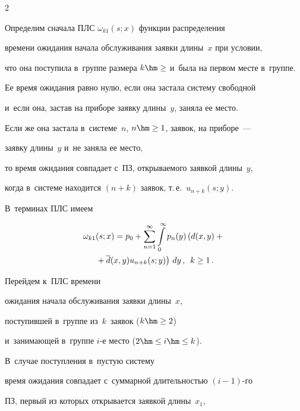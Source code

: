 \begin{multicols}{2}
\begin{description}
\end{description}





Определим сначала ПЛС $\omega_{k1}(s;x)$ функции распределения


времени ожидания начала обслуживания заявки длины~$x$ при условии,


что она поступила в~группе размера $k\hm\ge$ и~была на первом месте в~группе.


Ее время ожидания равно нулю, если она застала систему свободной 


и~если она, застав на приборе заявку длины~$y$, заняла ее место.


Если же она застала в~системе~$n$, $n\hm\ge 1$, заявок, на приборе~---


заявку длины~$y$ и~не заняла ее место,


то время ожидания совпадает с~ПЗ, открываемого заявкой длины~$y$,


когда в~системе находится $(n+k)$ заявок, т.\,е.\ $u_{n+k}(s;y)$. 


В~терминах ПЛС имеем


\begin{multline*}


\omega_{k1}(s;x) = p_0 + \sum\limits_{n=1}^\infty


\int\limits_0^\infty p_n(y) \left( 


\vphantom{'d}


d(x,y) +{}\right.\\


\left.{}+ \d(x,y) u_{n+k}(s;y) \right )\,


dy\,, \enskip k \ge 1\,.


\end{multline*}





Перейдем к~ПЛС времени


ожидания начала обслуживания заявки длины~$x$,


поступившей в~группе из~$k$~заявок ($k\hm\ge2$)


и~занимающей в~группе $i$-е мес\-то ($2 \hm\le i\hm\le k$).


В~случае поступления в~пустую систему


время ожидания совпадает с~суммарной дли\-тель\-ностью $(i-1)$-го


ПЗ, первый из которых от\-кры\-вается заявкой длины~$x_1$,



\end{multicols}
